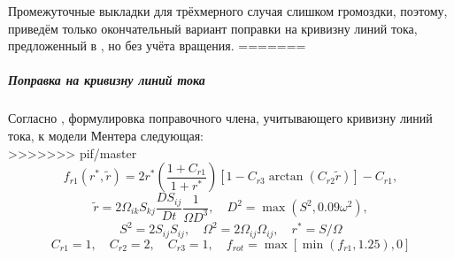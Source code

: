 		Промежуточные выкладки для трёхмерного случая слишком громоздки, поэтому, приведём только окончательный вариант поправки на кривизну линий тока, предложенный в \cite{Smirnov}, но без учёта вращения.
=======
	\subparagraph{Поправка на кривизну линий тока\\}
		\label{CC}
		Согласно \cite{Smirnov}, формулировка поправочного члена, учитывающего кривизну линий тока, к модели Ментера следующая:\\
>>>>>>> pif/master
		\begin{equation}
				f_{r1}(r^*,\tilde{r}) = 2r^*\left( \frac{1+C_{r1}}{1+ r^*} \right)\left[ 1-C_{r3}\arctan{(C_{r2}\tilde{r})} \right] - C_{r1},
		\end{equation}
		\begin{equation}
				\tilde{r} = 2\Omega_{ik}S_{kj}\frac{DS_{ij}}{Dt}\frac{1}{\Omega D^3}, \quad D^2 = \max(S^2, 0.09 \omega^2),
		\end{equation}
		$$
				S^2 = 2 S_{ij}S_{ij}, \quad \Omega^2 = 2 \Omega_{ij} \Omega_{ij}, \quad r^* = S/\Omega
		$$
		$$
				C_{r1} = 1, \quad C_{r2} = 2, \quad C_{r3} = 1, \quad f_{rot} = \max[\min(f_{r1},1.25),0]
		$$
